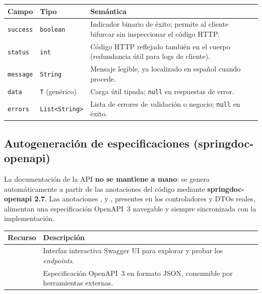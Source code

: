 \vspace{0.2cm}
\noindent
\renewcommand{\arraystretch}{1.3}
\fontsize{8.5}{10.2}\selectfont\sffamily
\begin{tabularx}{\textwidth}{|L{2.2cm}|C{2.4cm}|Y|}
\hline
{}
\sffamily\textbf{Campo} & \sffamily\textbf{Tipo} & \sffamily\textbf{Semántica} \\
\hline
\texttt{success} & \texttt{boolean} & Indicador binario de éxito; permite al cliente bifurcar sin inspeccionar el código HTTP. \\ \hline
{}
\texttt{status} & \texttt{int} & Código HTTP reflejado también en el cuerpo (redundancia útil para logs de cliente). \\ \hline
\texttt{message} & \texttt{String} & Mensaje legible, ya localizado en español cuando procede. \\ \hline
{}
\texttt{data} & \texttt{T} (genérico) & Carga útil tipada; \texttt{null} en respuestas de error. \\ \hline
\texttt{errors} & \texttt{List<String>} & Lista de errores de validación o negocio; \texttt{null} en éxito. \\ \hline
\end{tabularx}
\label{tab:apiresponse-campos}

\subsection{Autogeneración de especificaciones (springdoc-openapi)}
\label{subsec:openapi}

La documentación de la API \textbf{no se mantiene a mano}: se genera automáticamente a
partir de las anotaciones del código mediante \textbf{springdoc-openapi 2.7}. Las
anotaciones ,  y , presentes en los
controladores y DTOs reales, alimentan una especificación OpenAPI~3 navegable y siempre
sincronizada con la implementación.

\vspace{0.2cm}
\noindent
\renewcommand{\arraystretch}{1.3}
\fontsize{9}{10.8}\selectfont\sffamily
\begin{tabularx}{\textwidth}{|L{4.0cm}|Y|}
\hline
{}
\sffamily\textbf{Recurso} & \sffamily\textbf{Descripción} \\
\hline
{} & Interfaz interactiva Swagger UI para explorar y probar los \textit{endpoints}. \\
\hline
{}
 & Especificación OpenAPI~3 en formato JSON, consumible por herramientas externas. \\
\hline
\end{tabularx}

